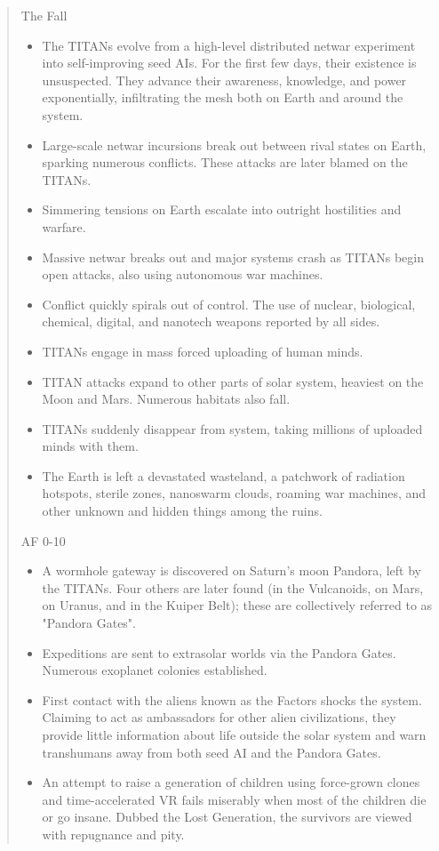 \begin{quote}
   The Fall
   \begin{itemize}
      \item The TITANs evolve from a high-level distributed netwar experiment
         into self-improving seed AIs. For the first few days, their existence
         is unsuspected. They advance their awareness, knowledge, and power
         exponentially, infiltrating the mesh both on Earth and around the system.
      \item Large-scale netwar incursions break out between rival states on
         Earth, sparking numerous conflicts. These attacks are later blamed on
         the TITANs.
      \item Simmering tensions on Earth escalate into outright hostilities
         and warfare.
      \item Massive netwar breaks out and major systems crash as TITANs begin
         open attacks, also using autonomous war machines.
      \item Conflict quickly spirals out of control. The use of nuclear,
         biological, chemical, digital, and nanotech weapons reported by all sides.
      \item TITANs engage in mass forced uploading of human minds.
      \item TITAN attacks expand to other parts of solar system, heaviest on
         the Moon and Mars. Numerous habitats also fall.
      \item TITANs suddenly disappear from system, taking millions of uploaded
         minds with them.
      \item The Earth is left a devastated wasteland, a patchwork of radiation
         hotspots, sterile zones, nanoswarm clouds, roaming war machines, and
         other unknown and hidden things among the ruins.
   \end{itemize}


   AF 0-10
   \begin{itemize}
      \item A wormhole gateway is discovered on Saturn's moon Pandora, left by
         the TITANs. Four others are later found (in the Vulcanoids, on Mars,
         on Uranus, and in the Kuiper Belt); these are collectively referred
         to as "Pandora Gates".
      \item Expeditions are sent to extrasolar worlds via the Pandora Gates.
         Numerous exoplanet colonies established.
      \item First contact with the aliens known as the Factors shocks the
         system. Claiming to act as ambassadors for other alien civilizations,
         they provide little information about life outside the solar system
         and warn transhumans away from both seed AI and the Pandora Gates.
      \item An attempt to raise a generation of children using force-grown
         clones and time-accelerated VR fails miserably when most of the
         children die or go insane. Dubbed the Lost Generation, the survivors
         are viewed with repugnance and pity.
   \end{itemize}



\end{quote}
